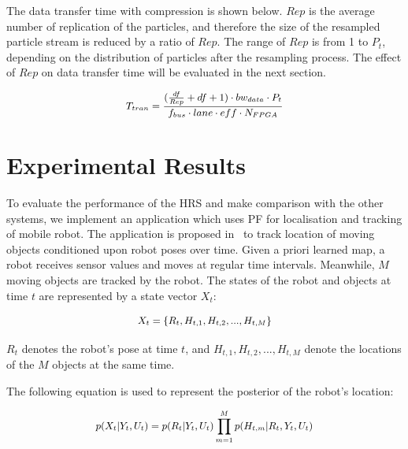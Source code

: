 The data transfer time with compression is shown below. 
$Rep$ is the average number of replication of the particles,
and therefore the size of the resampled particle stream is reduced by a ratio of $Rep$.
The range of $Rep$ is from 1 to $P_t$, depending on the distribution of particles after the resampling process.
The effect of $Rep$ on data transfer time will be evaluated in the next section.

\begin{equation}
\small
\begin{aligned}
T_{tran} = \frac{(\frac{df}{Rep} + df + 1) \cdot bw_{data} \cdot P_t}{f_{bus} \cdot lane \cdot eff \cdot N_{FPGA}}
\end{aligned}
\label{eqt:data_opt}
\end{equation}

\section{Experimental Results}
\label{sec:results}

To evaluate the performance of the HRS and make comparison with the other systems, 
we implement an application which uses PF for localisation and tracking of mobile robot.
The application is proposed in~\cite{montemerlo02} to track location of moving objects conditioned upon robot poses over time.
Given a priori learned map, a robot receives sensor values and moves at regular time intervals. 
Meanwhile, $M$ moving objects are tracked by the robot.
The states of the robot and objects at time $t$ are represented by a state vector $X_t$:
 
\begin{equation}
\small
\begin{aligned}
X_t = \{R_t, H_{t,1}, H_{t,2}, ..., H_{t,M}\}
\end{aligned}
\end{equation}

$R_t$ denotes the robot's pose at time $t$, and $H_{t,1}, H_{t,2}, ..., H_{t,M}$ denote the locations of the $M$ objects at the same time.

The following equation is used to represent the posterior of the robot's location:

\begin{equation}
\small
\begin{aligned}
p(X_t|Y_t,U_t) = p(R_t|Y_t,U_t) \prod_{m=1}^M p(H_{t,m}|R_t,Y_t,U_t)
\end{aligned}
\end{equation}

